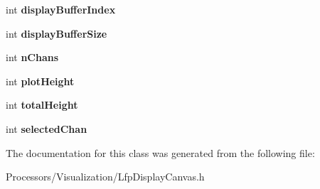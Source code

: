 \begin{DoxyCompactItemize}
\item 
\hypertarget{classLfpDisplayCanvas_a8497c8b6130d06b0bd9ca18aa3872e5b}{int {\bfseries display\-Buffer\-Index}}\label{classLfpDisplayCanvas_a8497c8b6130d06b0bd9ca18aa3872e5b}

\item 
\hypertarget{classLfpDisplayCanvas_a480191897221f5a134fc7c83da2a3f74}{int {\bfseries display\-Buffer\-Size}}\label{classLfpDisplayCanvas_a480191897221f5a134fc7c83da2a3f74}

\item 
\hypertarget{classLfpDisplayCanvas_a05f5be2c61686fba7a1ad4291242d02e}{int {\bfseries n\-Chans}}\label{classLfpDisplayCanvas_a05f5be2c61686fba7a1ad4291242d02e}

\item 
\hypertarget{classLfpDisplayCanvas_a7c877cb51dfa4838aeef77431fff25e3}{int {\bfseries plot\-Height}}\label{classLfpDisplayCanvas_a7c877cb51dfa4838aeef77431fff25e3}

\item 
\hypertarget{classLfpDisplayCanvas_acd39c32e833762f1a75a3d5b0e85fb24}{int {\bfseries total\-Height}}\label{classLfpDisplayCanvas_acd39c32e833762f1a75a3d5b0e85fb24}

\item 
\hypertarget{classLfpDisplayCanvas_a618847c62242d50acf36e724270babab}{int {\bfseries selected\-Chan}}\label{classLfpDisplayCanvas_a618847c62242d50acf36e724270babab}

\end{DoxyCompactItemize}


The documentation for this class was generated from the following file\-:\begin{DoxyCompactItemize}
\item 
Processors/\-Visualization/Lfp\-Display\-Canvas.\-h\end{DoxyCompactItemize}
